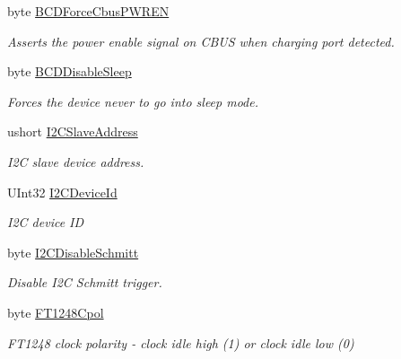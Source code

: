 \begin{DoxyCompactItemize}
byte \mbox{\hyperlink{class_f_t_d2_x_x___n_e_t_1_1_f_t_d_i_1_1_f_t___x_s_e_r_i_e_s___e_e_p_r_o_m___s_t_r_u_c_t_u_r_e_a3b6069e731a2b990eb40daa7f6955b2e}{B\+C\+D\+Force\+Cbus\+P\+W\+R\+EN}}
\begin{DoxyCompactList}\small\item\em Asserts the power enable signal on C\+B\+US when charging port detected. \end{DoxyCompactList}\item 
byte \mbox{\hyperlink{class_f_t_d2_x_x___n_e_t_1_1_f_t_d_i_1_1_f_t___x_s_e_r_i_e_s___e_e_p_r_o_m___s_t_r_u_c_t_u_r_e_ae4b56bed2c266975a4c825d2f0b3c711}{B\+C\+D\+Disable\+Sleep}}
\begin{DoxyCompactList}\small\item\em Forces the device never to go into sleep mode. \end{DoxyCompactList}\item 
ushort \mbox{\hyperlink{class_f_t_d2_x_x___n_e_t_1_1_f_t_d_i_1_1_f_t___x_s_e_r_i_e_s___e_e_p_r_o_m___s_t_r_u_c_t_u_r_e_a63a46c02e81149839557d02d494ac75a}{I2\+C\+Slave\+Address}}
\begin{DoxyCompactList}\small\item\em I2C slave device address. \end{DoxyCompactList}\item 
U\+Int32 \mbox{\hyperlink{class_f_t_d2_x_x___n_e_t_1_1_f_t_d_i_1_1_f_t___x_s_e_r_i_e_s___e_e_p_r_o_m___s_t_r_u_c_t_u_r_e_a9a07c320d93fbbf95e94f121c5203210}{I2\+C\+Device\+Id}}
\begin{DoxyCompactList}\small\item\em I2C device ID \end{DoxyCompactList}\item 
byte \mbox{\hyperlink{class_f_t_d2_x_x___n_e_t_1_1_f_t_d_i_1_1_f_t___x_s_e_r_i_e_s___e_e_p_r_o_m___s_t_r_u_c_t_u_r_e_a87aaf5302702fbf0ead2dea7709e667b}{I2\+C\+Disable\+Schmitt}}
\begin{DoxyCompactList}\small\item\em Disable I2C Schmitt trigger. \end{DoxyCompactList}\item 
byte \mbox{\hyperlink{class_f_t_d2_x_x___n_e_t_1_1_f_t_d_i_1_1_f_t___x_s_e_r_i_e_s___e_e_p_r_o_m___s_t_r_u_c_t_u_r_e_a63db8ae4261a0dd1520ee9d0e423fb13}{F\+T1248\+Cpol}}
\begin{DoxyCompactList}\small\item\em F\+T1248 clock polarity -\/ clock idle high (1) or clock idle low (0) \end{DoxyCompactList}\item 

\end{DoxyCompactItemize}
